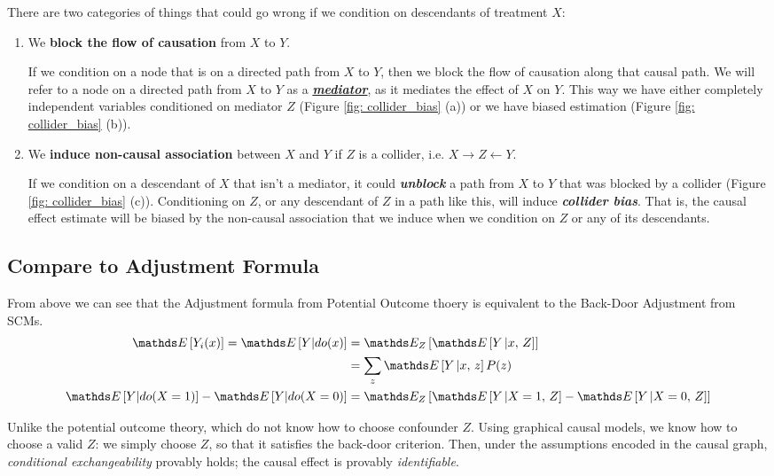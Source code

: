\documentclass[11pt]{article}
\begin{document}
There are two categories of things that could go wrong if we condition on descendants of treatment $X$:
\begin{enumerate}
\item We \textbf{block the flow of causation} from $X$ to $Y$. 

If we condition on a node that is on a directed path from $X$ to $Y$, then we block the flow of causation along that causal path. We will refer to a node
on a directed path from $X$ to $Y$ as a \underline{\emph{\textbf{mediator}}}, as it mediates the effect of $X$ on $Y$. This way we have either completely independent variables conditioned on mediator $Z$ (Figure \ref{fig: collider_bias} (a)) or we have biased estimation (Figure \ref{fig: collider_bias} (b)).

\item We \textbf{induce non-causal association} between $X$ and $Y$ if $Z$ is a collider, i.e. $X\rightarrow Z \leftarrow Y$.

If we condition on a descendant of $X$ that isn’t a mediator, it could \emph{\textbf{unblock}} a path from $X$ to $Y$ that was blocked by a collider (Figure \ref{fig: collider_bias} (c)). Conditioning on $Z$, or any descendant of $Z$ in a path like this, will induce \emph{\textbf{collider bias}}. That is, the causal effect estimate will be biased by the non-causal association that we induce when we condition on $Z$ or any of its descendants.
\end{enumerate}




\subsection{Compare to Adjustment Formula}
From above we can see that the Adjustment formula from Potential Outcome thoery is equivalent to the Back-Door Adjustment from SCMs.
\begin{align*}
 \E{}{Y_i(x) } = \E{}{Y| do(x)} &= \E{Z}{ \E{}{Y \,|x,\,Z } } \\
 &= \sum_{z}\E{}{Y \,|x,\,z } P(z) \\
  \E{}{Y| do(X=1)} -  \E{}{Y| do(X=0)} &= \E{Z}{ \E{}{Y \,|X=1,\,Z } -  \E{}{Y \,|X=0,\,Z }}
\end{align*}

Unlike the potential outcome theory, which do not know how to choose confounder $Z$. Using graphical causal models, we know how to choose a valid $Z$: we simply
choose $Z$, so that it satisfies the back-door criterion. Then, under the assumptions encoded in the causal graph, \emph{conditional exchangeability}
provably holds; the causal effect is provably \emph{identifiable}.

\newpage


\end{document}
